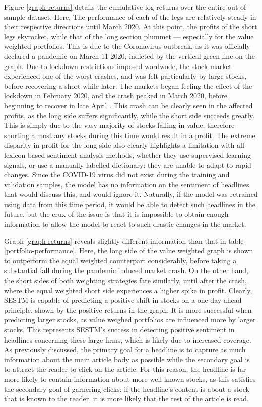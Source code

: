 Figure \ref{graph-returns} details the cumulative log returns over the entire out of sample dataset. Here, The performance of each of the legs are relatively steady in their respective directions until March 2020. At this point, the profits of the short legs skyrocket, while that of the long section plummet --- especially for the value weighted portfolios. This is due to the Coronavirus outbreak, as it was officially declared a pandemic on March 11 2020, indicted by the vertical green line on the graph. Due to lockdown restrictions imposed wordwode, the stock market experienced one of the worst crashes, and was felt particularly by large stocks, before recovering a short while later. The markets began feeling the effect of the lockdown in February 2020, and the crash peaked in March 2020, before beginning to recover in late April \parencite{covid-impact}. This crash can be clearly seen in the affected profits, as the long side suffers significantly, while the short side succeeds greatly. This is simply due to the vasy majority of stocks falling in value, therefore shorting almost any stocks during this time would result in a profit. The extreme disparity in profit for the long side also clearly highlights a limitation with all lexicon based sentiment analysis methods, whether they use supervised learning signals, or use a manually labelled dictionary: they are unable to adapt to rapid changes. Since the COVID-19 virus did not exist during the training and validation samples, the model has no information on the sentiment of headlines that would discuss this, and would ignore it. Naturally, if the model was retrained using data from this time period, it would be able to detect such headlines in the future, but the crux of the issue is that it is impossible to obtain enough information to allow the model to react to such drastic changes in the market.

Graph \ref{graph-returns} reveals slightly different information than that in table \ref{portfolio-performance}. Here, the long side of the value weighted graph is shown to outperform the equal weighted counterpart considerably, before taking a substantial fall during the pandemic induced market crash. On the other hand, the short sides of both weighting strategies fare similarly, until after the crash, where the equal weighted short side experiences a higher spike in profit. Clearly, SESTM is capable of predicting a positive shift in stocks on a one-day-ahead principle, shown by the positive returns in the graph. It is more successful when predicting larger stocks, as value weighed portfolios are influenced more by larger stocks. This represents SESTM's success in detecting positive sentiment in headlines concerning these large firms, which is likely due to increased coverage. As previously discussed, the primary goal for a headline is to capture as much information about the main article body as possible while the secondary goal is to attract the reader to click on the article. For this reason, the headline is far more likely to contain information about more well known stocks, as this satisfies the secondary goal of garnering clicks: if the headline's content is about a stock that is known to the reader, it is more likely that the rest of the article is read.

